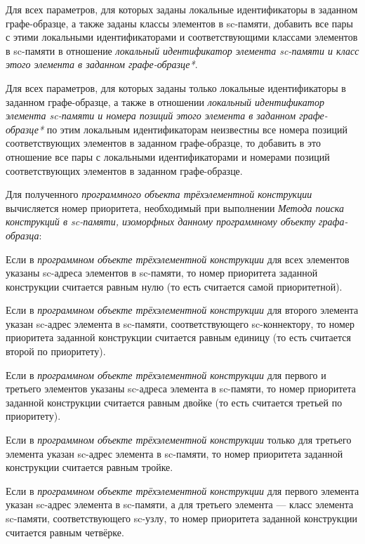 \begin{textitemize}
	\item Для всех параметров, для которых заданы локальные идентификаторы в заданном графе-образце, а также заданы классы элементов в sc-памяти, добавить все пары с этими локальными идентификаторами и соответствующими классами элементов в sc-памяти в отношение \textit{локальный идентификатор элемента sc-памяти и класс этого элемента в заданном графе-образце*}.
	\item Для всех параметров, для которых заданы только локальные идентификаторы в заданном графе-образце, а также в отношении \textit{локальный идентификатор элемента sc-памяти и номера позиций этого элемента в заданном графе-образце*} по этим локальным идентификаторам неизвестны все номера позиций соответствующих элементов в заданном графе-образце, то добавить в это отношение все пары с локальными идентификаторами и номерами позиций соответствующих элементов в заданном графе-образце.
	\item Для полученного \textit{программного объекта трёхэлементной конструкции} вычисляется номер приоритета, необходимый при выполнении \textit{Метода поиска конструкций в sc-памяти, изоморфных данному программному объекту графа-образца}:
	\begin{textitemize}
		\item Если в \textit{программном объекте трёхэлементной конструкции} для всех элементов указаны sc-адреса элементов в sc-памяти, то номер приоритета заданной конструкции считается равным нулю (то есть считается самой приоритетной).
		\item Если в \textit{программном объекте трёхэлементной конструкции} для второго элемента указан sc-адрес элемента в sc-памяти, соответствующего sc-коннектору, то номер приоритета заданной конструкции считается равным единицу (то есть считается второй по приоритету).
		\item Если в \textit{программном объекте трёхэлементной конструкции} для первого и третьего элементов указаны sc-адреса элемента в sc-памяти, то номер приоритета заданной конструкции считается равным двойке (то есть считается третьей по приоритету).
		\item Если в \textit{программном объекте трёхэлементной конструкции} только для третьего элемента указан sc-адрес элемента в sc-памяти, то номер приоритета заданной конструкции считается равным тройке.
		\item Если в \textit{программном объекте трёхэлементной конструкции} для первого элемента указан sc-адрес элемента в sc-памяти, а для третьего элемента --- класс элемента sc-памяти, соответствующего sc-узлу, то номер приоритета заданной конструкции считается равным четвёрке.

\end{textitemize}
\end{textitemize}
